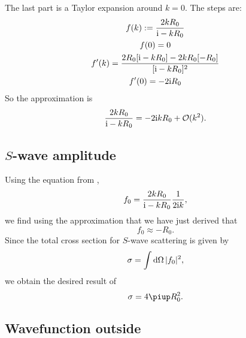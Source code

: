 \documentclass[11pt, english, fleqn, DIV=15, headinclude, BCOR=1.5cm]{scrartcl}
\begin{document}
The last part is a Taylor expansion around $k = 0$. The steps are:
\begin{gather*}
    f(k) := \frac{2 k R_0}{\mathrm i - k R_0} \\ 
    f(0) = 0 \\
    f'(k) = \frac{2 R_0 [\mathrm i - kR_0] - 2 k R_0[-R_0]}{[\mathrm i - kR_0]^2} \\
    f'(0) = - 2 \mathrm i R_0
\end{gather*}
So the approximation is
\[
    \frac{2 k R_0}{\mathrm i - k R_0}
    = - 2 \mathrm i k R_0 + \mathcal O(k^2).
\]

\subsection{$S$-wave amplitude}

Using the equation from \parencite[(18.96)]{Schwabl/Quantenmechanik},
\[
    f_0 = \frac{2kR_0}{\mathrm i - k R_0} \frac{1}{2 \mathrm i k},
\]
we find using the approximation that we have just derived that
\[
    f_0 \approx - R_0.
\]
Since the total cross section for $S$-wave scattering is given by
\[
    \sigma = \int \mathop{}\!\mathrm d \Omega \, |f_0|^2,
\]
we obtain the desired result of
\[
    \sigma = 4 \piup R_0^2.
\]

\subsection{Wavefunction outside}
\end{document}
